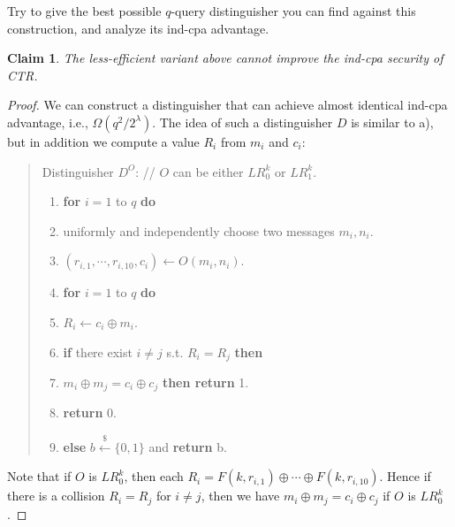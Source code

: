 \documentclass[12pt]{article}
\newcommand{\bits}{\{0,1\}}
\newcommand{\getsr}{\stackrel{\$}{\gets}}
\newcommand{\tab}{\hspace{0.3in}}
\newtheorem{claim}[theorem]{Claim}
\theoremstyle{definition}
\begin{document}
Try to give the best possible $q$-query distinguisher you can find against this construction, and analyze its ind-cpa advantage.

\begin{claim}
The less-efficient variant above cannot improve the ind-cpa security of CTR.
\end{claim}
\begin{proof}
We can construct a distinguisher that can achieve almost identical ind-cpa advantage, i.e., $\Omega(q^2/2^\lambda)$.
The idea of such a distinguisher $D$ is similar to a), but in addition we compute a value $R_i$ from $m_i$ and $c_i$:
\begin{quote}
Distinguisher $D^O$: // $O$ can be either $LR_0^k$ or $LR_1^k$.
\begin{enumerate}
\item {\bf for} $i=1$ to $q$ {\bf do}
\item \tab uniformly and independently choose two messages $m_i, n_i$.%
\item \tab $(r_{i,1}, \cdots, r_{i,10}, c_i) \gets O(m_i, n_i)$.
\item {\bf for} $i=1$ to $q$ {\bf do}
\item \tab $R_i \gets c_i \oplus m_i$.
\item {\bf if} there exist $i\not= j$ s.t. $R_i = R_j$ {\bf then}
\item \tab {\bf if} $m_i \oplus m_j = c_i \oplus c_j$ {\bf then return} 1.
\item \tab {\bf else} {\bf return} 0.
\item {\bf else} $b\getsr\bits$ and {\bf return} b.
\end{enumerate}
\end{quote}
Note that if $O$ is $LR_0^k$, then each $R_i = F(k, r_{i,1}) \oplus \cdots \oplus F(k, r_{i,10})$. Hence if there is a collision $R_i = R_j$ for $i \not= j$, then we have $m_i \oplus m_j = c_i \oplus c_j$ if $O$ is $LR_0^k$.


\end{proof}
\end{document}
